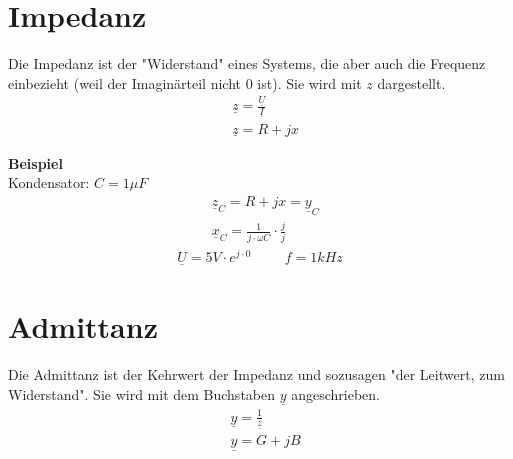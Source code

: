 \section{Impedanz}
Die Impedanz ist der "Widerstand" eines Systems, die aber auch die Frequenz einbezieht (weil der Imaginärteil nicht $0$ ist). Sie wird mit $z$ dargestellt.
\begin{align}
    &\underline{z}=\frac{\underline{U}}{\underline{I}}  \\
    &\underline{z}=R+jx
\end{align}

\textbf{Beispiel} \\
Kondensator: $C=1\mu F$\\
\begin{align}
    &\underline{z}_C=R+jx=\underline{y}_C                       \\
    &\underline{x}_C=\frac{1}{j\cdot\omega C}\cdot\frac{j}{j}
\end{align}
\begin{align}
    \underline{U}=5V\cdot e^{j\cdot 0} \hspace{1cm} f=1kHz
\end{align}

\section{Admittanz}
Die Admittanz ist der Kehrwert der Impedanz und sozusagen "der Leitwert, zum Widerstand". Sie wird mit dem Buchstaben $\underline{y}$ angeschrieben.
\begin{align}
    &\underline{y}=\frac{1}{\underline{z}}  \\
    &\underline{y}=G+jB
\end{align}